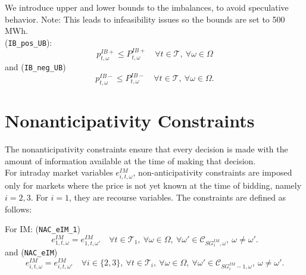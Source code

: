 \documentclass{article}
\begin{document}
We introduce upper and lower bounds to the imbalances, to avoid speculative behavior.
Note: This leads to infeasibility issues so the bounds are set to 500 MWh.\\

(\verb|IB_pos_UB|):\\
\begin{equation} \label{EQ:VPP_IB_MAX}
	p_{t, \omega}^{IB+} \leq P_{t, \omega}^{IB+} \quad \forall t \in \mathcal{T}, \ \forall \omega \in \Omega
\end{equation}
and (\verb|IB_neg_UB|)
\begin{equation} \label{EQ:VPP_IB_MIN}
	p_{t, \omega}^{IB-} \leq P_{t, \omega}^{IB-} \quad \forall t \in \mathcal{T}, \ \forall \omega \in \Omega.
\end{equation}




\section{Nonanticipativity Constraints}
\label{SEC:NonanticipativityConstraints}

The nonanticipativity constraints ensure that every decision is made with the amount of information available at the time of making that decision.\\

For intraday market variables \( e^{IM}_{i,t,\omega} \), non-anticipativity constraints are imposed only for markets where the price is not yet known at the time of bidding, namely \( i = 2, 3 \). For $i = 1$, they are recourse variables. The constraints are defined as follows:

For IM: (\verb|NAC_eIM_1|)
  \begin{equation} \label{EQ:NAC_eIM1}
  	e^{IM}_{1, t, \omega} = e^{IM}_{1, t, \omega'} \quad 
  	\forall t \in \mathcal{T}_1, \ 
  	\forall \omega \in \Omega, \ 
  	\forall \omega' \in \mathcal{C}_{SG^{IM}_1, \omega}, \ \omega \neq \omega'.
  \end{equation}
  and (\verb|NAC_eIM|)
\begin{equation} \label{EQ:NAC_eIM}
	e^{IM}_{i, t, \omega} = e^{IM}_{i, t, \omega'} \quad 
	\forall i \in \{2,3\}, \ \forall t \in \mathcal{T}_i, \ 
	\forall \omega \in \Omega, \ 
	\forall \omega' \in \mathcal{C}_{SG^{IM}_i - 1, \omega}, \ \omega \neq \omega'.
\end{equation}
\end{document}
